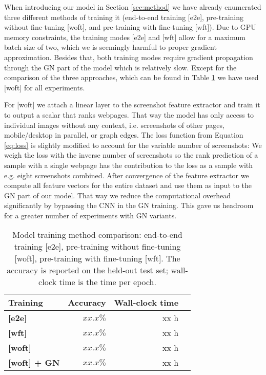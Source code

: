 When introducing our model in Section \ref{sec:method} we have already enumerated three different methods of training it (end-to-end training [e2e], pre-training without fine-tuning [woft], and pre-training with fine-tuning [wft]). Due to GPU memory constraints, the training modes [e2e] and [wft] allow for a maximum batch size of two, which we is seemingly harmful to proper gradient approximation. Besides that, both training modes require gradient propagation through the GN part of the model which is relatively slow. Except for the comparison of the three approaches, which can be found in Table \ref{tab:trainmethodcomparison} we have used [woft] for all experiments.

For [woft] we attach a linear layer to the screenshot feature extractor and train it to output a scalar that ranks webpages. That way the model has only access to individual images without any context, i.e. screenshots of other pages, mobile/desktop in parallel, or graph edges. The loss function from Equation \ref{eq:loss} is slightly modified to account for the variable number of screenshots: We weigh the loss with the inverse number of screenshots so the rank prediction of a sample with a single webpage has the contribution to the loss as a sample with e.g. eight screenshots combined. After convergence of the feature extractor we compute all feature vectors for the entire dataset and use them as input to the GN part of our model. That way we reduce the computational overhead significantly by bypassing the CNN in the GN training. This gave us headroom for a greater number of experiments with GN variants.

\begin{table}
    \centering
    \begin{tabular}{lrrr}
        \textbf{Training} & \textbf{Accuracy} & \textbf{Wall-clock time}\\\hline
        \textbf{[e2e]} & $xx.x\%$ & xx h\\
        \textbf{[wft]} & $xx.x\%$ & xx h\\
        \textbf{[woft]} & $xx.x\%$ & xx h\\
        \textbf{[woft] + GN} & $xx.x\%$ & xx h\\
    \end{tabular}
    \caption[Model training method comparison]{Model training method comparison: end-to-end training [e2e], pre-training without fine-tuning [woft], pre-training with fine-tuning [wft]. The accuracy is reported on the held-out test set; wall-clock time is the time per epoch.}
    \label{tab:trainmethodcomparison}
\end{table}

